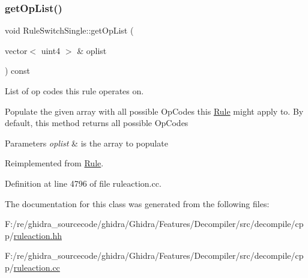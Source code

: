 \subsubsection{\texorpdfstring{getOpList()}{getOpList()}}
{\footnotesize\ttfamily void Rule\+Switch\+Single\+::get\+Op\+List (\begin{DoxyParamCaption}\item[{vector$<$ uint4 $>$ \&}]{oplist }\end{DoxyParamCaption}) const\hspace{0.3cm}{\ttfamily [virtual]}}



List of op codes this rule operates on. 

Populate the given array with all possible Op\+Codes this \mbox{\hyperlink{class_rule}{Rule}} might apply to. By default, this method returns all possible Op\+Codes 
\begin{DoxyParams}{Parameters}
{\em oplist} & is the array to populate \\
\hline
\end{DoxyParams}


Reimplemented from \mbox{\hyperlink{class_rule_a4023bfc7825de0ab866790551856d10e}{Rule}}.



Definition at line 4796 of file ruleaction.\+cc.



The documentation for this class was generated from the following files\+:\begin{DoxyCompactItemize}
\item 
F\+:/re/ghidra\+\_\+sourcecode/ghidra/\+Ghidra/\+Features/\+Decompiler/src/decompile/cpp/\mbox{\hyperlink{ruleaction_8hh}{ruleaction.\+hh}}\item 
F\+:/re/ghidra\+\_\+sourcecode/ghidra/\+Ghidra/\+Features/\+Decompiler/src/decompile/cpp/\mbox{\hyperlink{ruleaction_8cc}{ruleaction.\+cc}}\end{DoxyCompactItemize}
